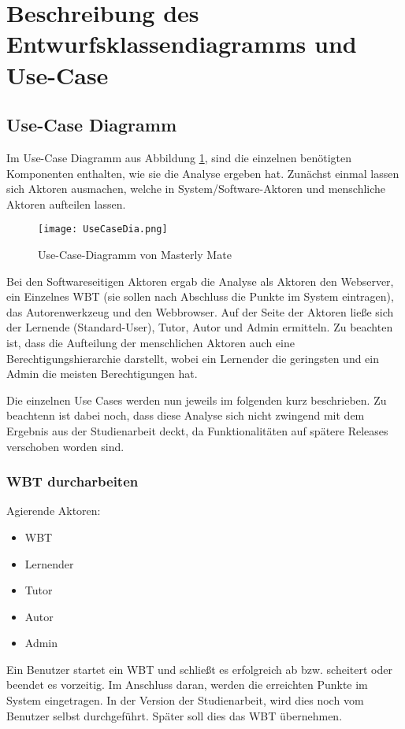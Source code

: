 \section{Beschreibung des Entwurfsklassendiagramms und
Use-Case}\label{ref:classModel}

\subsection{Use-Case Diagramm}
Im Use-Case Diagramm aus Abbildung \ref{ref:picUseCaseDia}, sind die einzelnen
benötigten Komponenten enthalten, wie sie die Analyse ergeben hat. Zunächst einmal lassen sich Aktoren
ausmachen, welche in System/Software-Aktoren und menschliche Aktoren aufteilen
lassen. 

\begin{figure}[ht]
\centering
\texttt{[image: UseCaseDia.png]}
\caption{Use-Case-Diagramm von Masterly Mate}\label{ref:picUseCaseDia}
\end{figure}

Bei den Softwareseitigen Aktoren ergab die Analyse als Aktoren den Webserver,
ein Einzelnes WBT (sie sollen nach Abschluss die Punkte im System eintragen),
das Autorenwerkzeug und den Webbrowser. Auf der Seite der Aktoren ließe sich der
Lernende (Standard-User), Tutor, Autor und Admin ermitteln. Zu beachten ist,
dass die Aufteilung der menschlichen Aktoren auch eine Berechtigungshierarchie
darstellt, wobei ein Lernender die geringsten und ein Admin die meisten
Berechtigungen hat.

Die einzelnen Use Cases werden nun jeweils im folgenden kurz beschrieben. Zu
beachtenn ist dabei noch, dass diese Analyse sich nicht zwingend mit dem
Ergebnis aus der Studienarbeit deckt, da Funktionalitäten auf spätere Releases
verschoben worden sind.

\subsubsection{WBT durcharbeiten} 
Agierende Aktoren: \begin{itemize}
  \item WBT
  \item Lernender
  \item Tutor
  \item Autor
  \item Admin 
\end{itemize}

Ein Benutzer startet ein WBT und schließt es erfolgreich ab bzw.
scheitert oder beendet es vorzeitig. Im Anschluss daran, werden die erreichten
Punkte im System eingetragen. In der Version der Studienarbeit, wird dies noch
vom Benutzer selbst durchgeführt. Später soll dies das WBT übernehmen.
	
